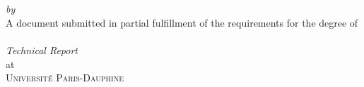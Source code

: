 \begin{titlepage}
  \vspace*{5cm}
  \makeatletter
  \begin{center}
    \begin{Huge}
      \@title
    \end{Huge}\\[0.1cm]
    \begin{Large}
      \@subtitle
    \end{Large} ~\\
    \emph{by} ~\\
    \@author
    \vfill
    A document submitted in partial fulfillment
    of the requirements for the degree of ~\\
    \emph{Technical Report} ~\\
    at ~\\
    \textsc{Université Paris-Dauphine}
  \end{center}
  \makeatother
\end{titlepage}

\newpage
\null
\thispagestyle{empty}
\newpage
